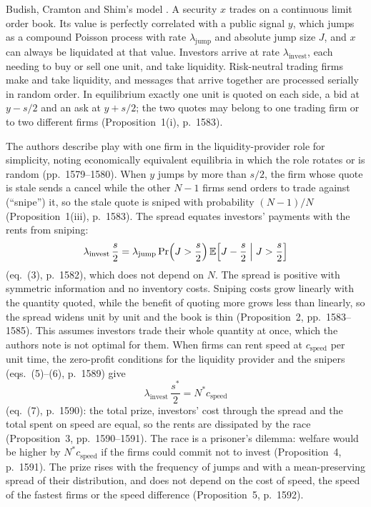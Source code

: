 \begin{qfresult}\label{res:latency-arbitrage-arms-race}
 Budish, Cramton and Shim's model \citep[secs.~VI.A--VI.B, pp.~1576--1583]{wide-budish-cramton-shim}. A security $x$ trades on a continuous limit order book. Its value is perfectly correlated with a public signal $y$, which jumps as a compound Poisson process with rate $\lambda_{\mathrm{jump}}$ and absolute jump size $J$, and $x$ can always be liquidated at that value. Investors arrive at rate $\lambda_{\mathrm{invest}}$, each needing to buy or sell one unit, and take liquidity. Risk-neutral trading firms make and take liquidity, and messages that arrive together are processed serially in random order. In equilibrium exactly one unit is quoted on each side, a bid at $y-s/2$ and an ask at $y+s/2$; the two quotes may belong to one trading firm or to two different firms (Proposition~1(i), p.~1583).

The authors describe play with one firm in the liquidity-provider role for simplicity, noting economically equivalent equilibria in which the role rotates or is random (pp.~1579--1580). When $y$ jumps by more than $s/2$, the firm whose quote is stale sends a cancel while the other $N-1$ firms send orders to trade against (``snipe'') it, so the stale quote is sniped with probability $(N-1)/N$ (Proposition~1(iii), p.~1583). The spread equates investors' payments with the rents from sniping:
\[ \lambda_{\mathrm{invest}}\,\frac{s}{2}=\lambda_{\mathrm{jump}}\Pr\Bigl(J>\frac s2\Bigr)\,\mathbb E\Bigl[J-\frac s2\Bigm|J>\frac s2\Bigr] \]
(eq.~(3), p.~1582), which does not depend on $N$. The spread is positive with symmetric information and no inventory costs. Sniping costs grow linearly with the quantity quoted, while the benefit of quoting more grows less than linearly, so the spread widens unit by unit and the book is thin (Proposition~2, pp.~1583--1585). This assumes investors trade their whole quantity at once, which the authors note is not optimal for them. When firms can rent speed at $c_{\mathrm{speed}}$ per unit time, the zero-profit conditions for the liquidity provider and the snipers (eqs.~(5)--(6), p.~1589) give
\[ \lambda_{\mathrm{invest}}\,\frac{s^*}{2}=N^*c_{\mathrm{speed}} \]
(eq.~(7), p.~1590): the total prize, investors' cost through the spread and the total spent on speed are equal, so the rents are dissipated by the race (Proposition~3, pp.~1590--1591). The race is a prisoner's dilemma: welfare would be higher by $N^*c_{\mathrm{speed}}$ if the firms could commit not to invest (Proposition~4, p.~1591). The prize rises with the frequency of jumps and with a mean-preserving spread of their distribution, and does not depend on the cost of speed, the speed of the fastest firms or the speed difference (Proposition~5, p.~1592).


\end{qfresult}
